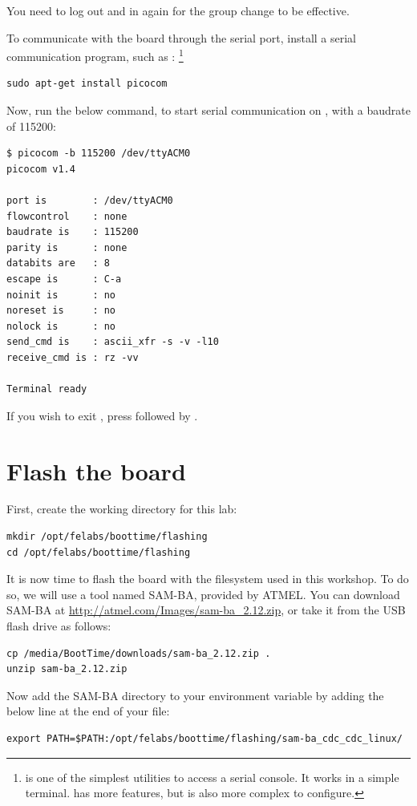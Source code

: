 You need to log out and in again for the group change to be effective.

To communicate with the board through the serial port, install a
serial communication program, such as :
\footnote{ is one of the simplest utilities to access a
serial console. It works in a simple terminal.  has more
features, but is also more complex to configure.}

\begin{verbatim}
sudo apt-get install picocom
\end{verbatim}

Now, run the below command, to start serial communication on
, with a baudrate of 115200:

\begin{verbatim}
$ picocom -b 115200 /dev/ttyACM0
picocom v1.4

port is        : /dev/ttyACM0
flowcontrol    : none
baudrate is    : 115200
parity is      : none
databits are   : 8
escape is      : C-a
noinit is      : no
noreset is     : no
nolock is      : no
send_cmd is    : ascii_xfr -s -v -l10
receive_cmd is : rz -vv

Terminal ready
\end{verbatim}

If you wish to exit , press \code{[Ctrl][a]} followed by
\code{[Ctrl][x]}.

\section{Flash the board}

First, create the working directory for this lab:

\begin{verbatim}
mkdir /opt/felabs/boottime/flashing
cd /opt/felabs/boottime/flashing
\end{verbatim}

It is now time to flash the board with the filesystem used in this
workshop. To do so, we will use a tool named SAM-BA, provided by
ATMEL. You can download SAM-BA at
\url{http://atmel.com/Images/sam-ba_2.12.zip}, or take it from the USB
flash drive as follows:

\begin{verbatim}
cp /media/BootTime/downloads/sam-ba_2.12.zip .
unzip sam-ba_2.12.zip
\end{verbatim}

Now add the SAM-BA directory to your  environment variable
by adding the below line at the end of your  file:
\begin{verbatim}
export PATH=$PATH:/opt/felabs/boottime/flashing/sam-ba_cdc_cdc_linux/
\end{verbatim}

